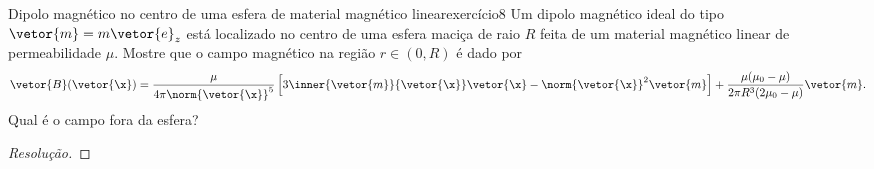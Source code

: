 \begin{exercício}{Dipolo magnético no centro de uma esfera de material magnético linear}{exercício8}
    Um dipolo magnético ideal do tipo \(\vetor{m} = m\vetor{e}_z\) está localizado no centro de uma esfera maciça de raio \(R\) feita de um material magnético linear de permeabilidade \(\mu\). Mostre que o campo magnético na região \(r \in (0,R)\) é dado por
    \begin{equation*}
        \vetor{B}(\vetor{\x}) = \frac{\mu}{4\pi\norm{\vetor{\x}}^5}\left[3\inner{\vetor{m}}{\vetor{\x}}\vetor{\x} - \norm{\vetor{\x}}^2\vetor{m}\right] + \frac{\mu(\mu_0 - \mu)}{2\pi R^3(2\mu_0 - \mu)}\vetor{m}.
    \end{equation*}
    Qual é o campo fora da esfera?
\end{exercício}
\begin{proof}[Resolução]

\end{proof}
